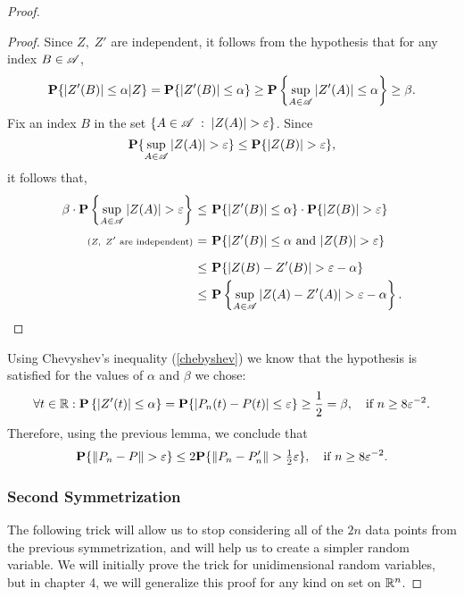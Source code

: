 \begin{proof}
  \begin{proof}
    Since $Z,\; Z'$ are independent, it follows from the hypothesis that for any index $B \in \AA$,
    \[ \P\{|Z'(B)|\leq \alpha | Z\} = \P\{|Z'(B)|\leq \alpha\} \geq \P \left\{ \sup_{A\in \AA}|Z'(A)|\leq \alpha \right\} \geq \beta.\] 
    Fix an index $B$ in the set $\{ A \in \AA \;:\; |Z(A)| > \varepsilon\}$. Since 
    \[ \P\{\sup_{A\in \AA} |Z(A)| > \varepsilon\} \leq \P\{|Z(B)| > \varepsilon\}, \]
    it follows that,
    \[\everymath{\displaystyle}\arraycolsep=1.8pt\def\arraystretch{1.8}
    \begin{array}{rcl}
      \beta \cdot \P\left\{\sup_{A\in \AA} |Z(A)| > \varepsilon \right\} & \leq & \P\{|Z'(B)| \leq \alpha\} \cdot \P\{|Z(B)| > \varepsilon\}\\
      {\text{\scriptsize ($Z,\; Z'$ are independent)}} & = & \P\{|Z'(B)| \leq \alpha\text{ and } |Z(B)| > \varepsilon\}\\
       & \leq & \P\{ |Z(B) - Z'(B)| > \varepsilon - \alpha \}\\
        & \leq & \P\left\{\sup_{A\in \AA} |Z(A)-Z'(A)| > \varepsilon - \alpha \right\}.
    \end{array} \] 
  \end{proof}
  Using Chevyshev's inequality (\ref{chebyshev}) we know that the hypothesis is satisfied for the values of $\alpha$ and $\beta$ we chose:
  \[\forall t\in \R: \P\left\{ |Z'(t)| \leq \alpha \right\} = \P\{|P_n(t) - P(t)| \leq \varepsilon\} \geq \frac{1}{2} = \beta,\hspace*{1em} \text{if $n \geq 8\varepsilon^{-2}$}.\]
  Therefore, using the previous lemma, we conclude that
  \begin{equation}
    \label{gc:1} 
    \P\{\|P_n-P\| > \varepsilon\} \leq 2 \P\{\|P_n-P_n'\| > \tfrac{1}{2} \varepsilon\},\hspace*{1em} \text{if $n \geq 8\varepsilon^{-2}$}.
  \end{equation}

  \vspace*{1em}

  \subsubsection*{Second Symmetrization}
  The following trick will allow us to stop considering all of the $2n$ data points from the previous symmetrization, and will help us to create a simpler random variable. We will initially prove the trick for unidimensional random variables, but in chapter 4, we will generalize this proof for any kind on set on $\R^n$.


\end{proof}
